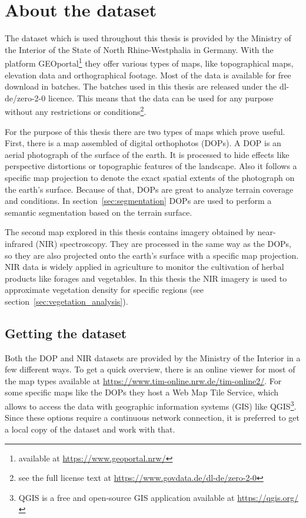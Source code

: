 \section{About the dataset}

The dataset which is used throughout this thesis is provided by the Ministry of the Interior of the State of North Rhine-Westphalia in Germany. With the platform GEOportal\footnote{available at \url{https://www.geoportal.nrw/}} they offer various types of maps, like topographical maps, elevation data and orthographical footage. Most of the data is available for free download in batches. The batches used in this thesis are released under the dl-de/zero-2-0 licence. This means that the data can be used for any purpose without any restrictions or conditions\footnote{see the full license text at \url{https://www.govdata.de/dl-de/zero-2-0}}.

For the purpose of this thesis there are two types of maps which prove useful. First, there is a map assembled of digital orthophotos (DOPs). A DOP is an aerial photograph of the surface of the earth. It is processed to hide effects like perspective distortions or topographic features of the landscape. Also it follows a specific map projection to denote the exact spatial extents of the photograph on the earth's surface. Because of that, DOPs are great to analyze terrain coverage and conditions. In section~\ref{sec:segmentation} DOPs are used to perform a semantic segmentation based on the terrain surface.

The second map explored in this thesis contains imagery obtained by near-infrared (NIR) spectroscopy. They are processed in the same way as the DOPs, so they are also projected onto the earth's surface with a specific map projection. NIR data is widely applied in agriculture to monitor the cultivation of herbal products like forages and vegetables. In this thesis the NIR imagery is used to approximate vegetation density for specific regions (see section~\ref{sec:vegetation_analysis}).

\subsection{Getting the dataset}
Both the DOP and NIR datasets are provided by the Ministry of the Interior in a few different ways. To get a quick overview, there is an online viewer for most of the map types available at \url{https://www.tim-online.nrw.de/tim-online2/}. For some specific maps like the DOPs they host a Web Map Tile Service, which allows to access the data with geographic information systems (GIS) like QGIS\footnote{QGIS is a free and open-source GIS application available at \url{https://qgis.org/}}. Since these options require a continuous network connection, it is preferred to get a local copy of the dataset and work with that.

